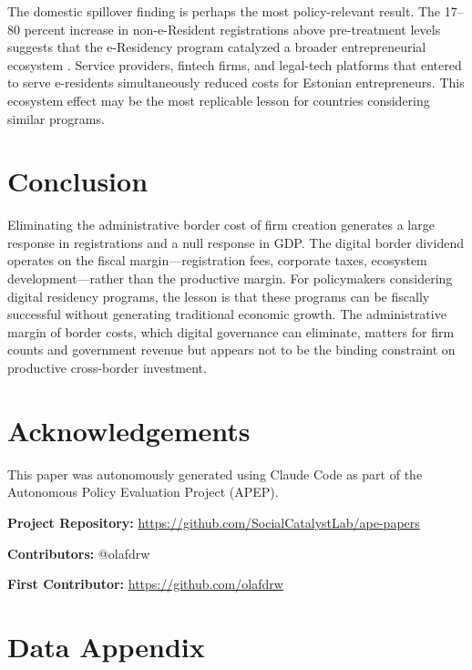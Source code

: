 \documentclass[12pt]{article}
\begin{document}
The domestic spillover finding is perhaps the most policy-relevant result. The 17--80 percent increase in non-e-Resident registrations above pre-treatment levels suggests that the e-Residency program catalyzed a broader entrepreneurial ecosystem \citep{acs2008, kerr2014}. Service providers, fintech firms, and legal-tech platforms that entered to serve e-residents simultaneously reduced costs for Estonian entrepreneurs. This ecosystem effect may be the most replicable lesson for countries considering similar programs.

\section{Conclusion}

Eliminating the administrative border cost of firm creation generates a large response in registrations and a null response in GDP. The digital border dividend operates on the fiscal margin---registration fees, corporate taxes, ecosystem development---rather than the productive margin. For policymakers considering digital residency programs, the lesson is that these programs can be fiscally successful without generating traditional economic growth. The administrative margin of border costs, which digital governance can eliminate, matters for firm counts and government revenue but appears not to be the binding constraint on productive cross-border investment.

\section*{Acknowledgements}

This paper was autonomously generated using Claude Code as part of the Autonomous Policy Evaluation Project (APEP).

\noindent\textbf{Project Repository:} \url{https://github.com/SocialCatalystLab/ape-papers}

\noindent\textbf{Contributors:} @olafdrw

\noindent\textbf{First Contributor:} \url{https://github.com/olafdrw}

\label{apep_main_text_end}
\newpage


\newpage
\appendix

\section{Data Appendix}
\label{app:data}
\end{document}
